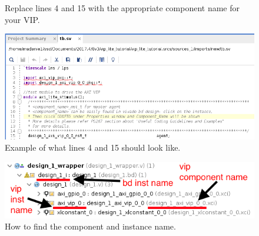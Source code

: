 \documentclass[11pt]{article}
\begin{document}
\begin{enumerate}
\begin{figure}[H]
		  \caption{Replace lines 4 and 15 with the appropriate component name for your VIP.}
		  \label{fig:componentname1}
		\end{figure}
		\begin{figure}[H]
		  \centering
		  \includegraphics[scale=0.5]{componentname2.png}
		  \caption{Example of what lines 4 and 15 should look like.}
		  \label{fig:componentname2}
		\end{figure}
		\begin{figure}[H]
		  \centering
		  \includegraphics[scale=0.5]{filehierarchy2.png}
		  \caption{How to find the component and instance name.}
		  \label{fig:findnames}
		\end{figure}
		

\end{enumerate}
\end{document}

